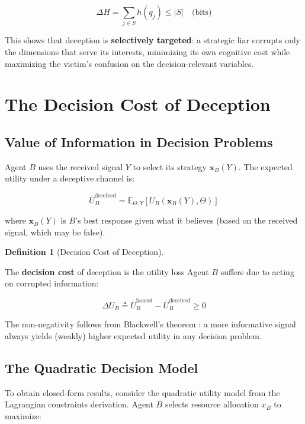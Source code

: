 \documentclass[11pt]{article}
\theoremstyle{plain}
\theoremstyle{definition}
\newtheorem{definition}{Definition}
\theoremstyle{remark}
\let\origsection\section
\renewcommand{\section}{\needspace{12\baselineskip}\origsection}
\let\origsubsection\subsection
\renewcommand{\subsection}{\needspace{7\baselineskip}\origsubsection}
\begin{document}
\[\Delta H = \sum_{j \in S} h(q_j) \leq |S| \quad \text{(bits)}\]

This shows that deception is \textbf{selectively targeted}: a strategic
liar corrupts only the dimensions that serve its interests, minimizing
its own cognitive cost while maximizing the victim's confusion on the
decision-relevant variables.

\section{The Decision Cost of
Deception}\label{the-decision-cost-of-deception}

\subsection{Value of Information in Decision
Problems}\label{value-of-information-in-decision-problems}

Agent \(B\) uses the received signal \(Y\) to select its strategy
\(\mathbf{x}_B(Y)\). The expected utility under a deceptive channel is:

\[\bar{U}_B^{\text{deceived}} = \mathbb{E}_{\Theta, Y}\left[ U_B\left(\mathbf{x}_B(Y), \Theta\right) \right]\]

where \(\mathbf{x}_B(Y)\) is \(B\)'s best response given what it
believes (based on the received signal, which may be false).

\begin{definition}[Decision Cost of Deception]
\label{def-decision-cost-deception}

The \textbf{decision cost} of deception is the utility loss Agent $B$ suffers due to acting on corrupted information:

$$\Delta U_B \triangleq \bar{U}_B^{\text{honest}} - \bar{U}_B^{\text{deceived}} \geq 0$$
\end{definition}

The non-negativity follows from Blackwell's theorem
\citeyearpar{Blackwell1953}: a more informative signal always yields
(weakly) higher expected utility in any decision problem.

\subsection{The Quadratic Decision
Model}\label{the-quadratic-decision-model}

To obtain closed-form results, consider the quadratic utility model from
the Lagrangian constraints derivation. Agent \(B\) selects resource
allocation \(x_B\) to maximize:
\end{document}
